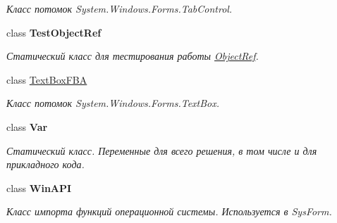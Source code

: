 \begin{DoxyCompactItemize}
\begin{DoxyCompactList}\small\item\em Класс потомок System.\+Windows.\+Forms.\+Tab\+Control. \end{DoxyCompactList}\item 
class {\bfseries Test\+Object\+Ref}
\begin{DoxyCompactList}\small\item\em Статический класс для тестирования работы \mbox{\hyperlink{class_f_b_a_1_1_object_ref}{Object\+Ref}}. \end{DoxyCompactList}\item 
class \mbox{\hyperlink{class_f_b_a_1_1_text_box_f_b_a}{Text\+Box\+F\+BA}}
\begin{DoxyCompactList}\small\item\em Класс потомок System.\+Windows.\+Forms.\+Text\+Box. ~\newline
\end{DoxyCompactList}\item 
class {\bfseries Var}
\begin{DoxyCompactList}\small\item\em Статический класс. Переменные для всего решения, в том числе и для прикладного кода. \end{DoxyCompactList}\item 
class {\bfseries Win\+A\+PI}
\begin{DoxyCompactList}\small\item\em Класс импорта функций операционной системы. Используется в Sys\+Form. \end{DoxyCompactList}\end{DoxyCompactItemize}
